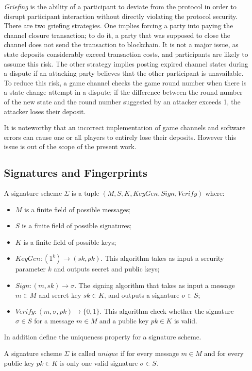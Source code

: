 \textit {Griefing} is the ability of a participant to deviate from the protocol in order to disrupt participant interaction without directly violating the protocol security. There are two griefing strategies. One implies forcing a party into paying the channel closure transaction; to do it, a party that was supposed to close the channel does not send the transaction to blockchain. It is not a major issue, as state deposits considerably exceed transaction costs, and participants are likely to assume this risk. The other strategy implies posting expired channel states during a dispute if an attacking party believes that the other participant is unavailable. To reduce this risk, a game channel checks the game round number when there is a state change attempt in a dispute; if the difference between the round number of the new state and the round number suggested by an attacker exceeds 1, the attacker loses their deposit.

It is noteworthy that an incorrect implementation of game channels and software errors can cause one or all players to entirely lose their deposits. However this issue is out of the scope of the present work.

	\subsection{Signatures and Fingerprints}
\begin{defn}
A signature scheme $ \Sigma $ is a tuple $(M, S, K, KeyGen, Sign, Verify)$ where:
	\begin{itemize}
		\item $ M $ is a finite field of possible messages;
		\item $ S $ is a finite field of possible signatures;
		\item $ K $ is a finite field of possible keys;
		\item $ KeyGen: (1^k) \rightarrow (sk, pk) $. This algorithm takes as input a security parameter $k$ and outputs secret and public keys;
		\item $Sign: (m, sk) \rightarrow \sigma $. The signing algorithm that takes as input a message $m \in M$ and secret key $sk \in K$, and outputs a signature $\sigma \in S$;
	\item $Verify: (m, \sigma, pk) \rightarrow \{0, 1\} $. This algorithm check whether the signature $\sigma \in S$ for a message $m \in M$ and a public key $pk \in K$ is valid.
	\end{itemize}
\end{defn}
In addition define the uniqueness property for a signature scheme. 
\begin{defn}
A signature scheme $ \Sigma $ is called $unique$ if for every message $m \in M$ and for every public key $pk \in K$ is only one valid signature $\sigma \in S$.
\end{defn}

